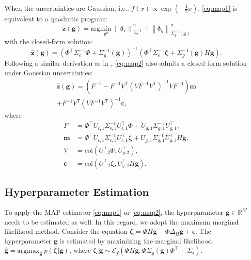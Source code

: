 \documentclass{ifacconf}
\newcommand{\norm}[1]{\left\lVert#1\right\rVert}
\newcommand{\col}[1]{\mathrm{col}\left(#1\right)}
\newcommand{\ellip}[1]{\mathcal{E}_f\left(#1\right)}
\begin{document}
When the uncertainties are Gaussian, i.e., $f(x)\propto\exp\left(-\frac{1}{2}x\right)$, \eqref{eq:map1} is equivalent to a quadratic program:
\begin{equation}
\hat{\mathbf{z}}(\mathbf{g})=\mathrm{arg}\underset{\mathbf{z}^0}{\mathrm{min}}\ \norm{\boldsymbol{\delta}_\epsilon}_{\Sigma_\epsilon^{-1}}^2 + \norm{\boldsymbol{\delta}_g}_{\Sigma_g^{-1}(\mathbf{g})}^2
\end{equation}
with the closed-form solution:
\begin{equation}
    \hat{\mathbf{z}}(\mathbf{g})=\left(\Phi^\top\Sigma_\epsilon^{-1}\Phi+\Sigma_g^{-1}(\mathbf{g})\right)^{-1}\left(\Phi^\top\Sigma_\epsilon^{-1}\boldsymbol{\zeta}+\Sigma_g^{-1}(\mathbf{g})H\mathbf{g}\right).
    \label{eqn:clsol1}
\end{equation}
Following a similar derivation as in \cite{yin2020maximum}, \eqref{eq:map2} also admits a closed-form solution under Gaussian uncertainties:
\begin{multline}
    \hat{\mathbf{z}}(\mathbf{g}) = \left(F^{-1}-F^{-1}V^\mathsf{T}(V F^{-1}V^\mathsf{T})^{-1}VF^{-1}\right)\mathbf{m}\\+F^{-1}V^\mathsf{T}(V F^{-1}V^\mathsf{T})^{-1}\mathbf{c},
    \label{eqn:clsol2}
\end{multline}
where
\begin{align*}
F&=\Phi^\top U_{\epsilon,1}\Sigma_{\epsilon,1}^{-1}U_{\epsilon,1}^\top\Phi+U_{g,1}\Sigma_{g,1}^{-1}U_{g,1}^\top,\\
\mathbf{m}&=\Phi^\top U_{\epsilon,1}\Sigma_{\epsilon,1}^{-1}U_{\epsilon,1}^\top\boldsymbol{\zeta}+U_{g,1}\Sigma_{g,1}^{-1}U_{g,1}^\top H\mathbf{g},\\
V&=\col{U_{\epsilon,2}^\top\Phi,U_{g,2}^\top},\\
\mathbf{c}&=\col{U_{\epsilon,2}^\top\boldsymbol{\zeta},U_{g,2}^\top H\mathbf{g}}.
\end{align*}

\subsection{Hyperparameter Estimation}

To apply the MAP estimator \eqref{eq:map1} or \eqref{eq:map2}, the hyperparameter $\mathbf{g}\in\mathbb{R}^M$ needs to be estimated as well. In this regard, we adopt the maximum marginal likelihood method. Consider the equation $\boldsymbol{\zeta} = \Phi H\mathbf{g} - \Phi\Delta_H\mathbf{g} + \boldsymbol{\epsilon}$. The hyperparameter $\mathbf{g}$ is estimated by maximizing the marginal likelihood: $\hat{\mathbf{g}}=\mathrm{arg}\mathrm{max}_\mathbf{g}\ p\left(\boldsymbol{\zeta}|\mathbf{g}\right)$, where $\boldsymbol{\zeta}|\mathbf{g}\sim\ellip{\Phi H\mathbf{g},\Phi\Sigma_g(\mathbf{g})\Phi^\top+\Sigma_\epsilon}$.
\end{document}
